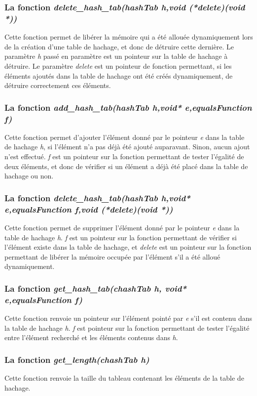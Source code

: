 \documentclass{report}
\begin{document}
\subsubsection*{La fonction \textit{delete\_hash\_tab(hashTab h,void (*delete)(void *))}}
Cette fonction permet de libérer la mémoire qui a été allouée dynamiquement lors de la création d'une table de hachage, et donc de détruire cette dernière. Le paramètre \textit{h} passé en paramètre est un pointeur sur la table de hachage à détruire. Le paramètre \textit{delete} est un pointeur de fonction permettant, si les éléments ajoutés dans la table de hachage ont été créés dynamiquement, de détruire correctement ces éléments.
\subsubsection*{La fonction \textit{add\_hash\_tab(hashTab h,void* e,equalsFunction f)}}
Cette fonction permet d'ajouter l'élément donné par le pointeur \textit{e} dans la table de hachage \textit{h}, si l'élément n'a pas déjà été ajouté auparavant. Sinon, aucun ajout n'est effectué. \textit{f} est un pointeur sur la fonction permettant de tester l'égalité de deux éléments, et donc de vérifier si un élément a déjà été placé dans la table de hachage ou non.
\subsubsection*{La fonction \textit{delete\_hash\_tab(hashTab h,void* e,equalsFunction f,void (*delete)(void *))}}
Cette fonction permet de supprimer l'élément donné par le pointeur \textit{e} dans la table de hachage \textit{h}. \textit{f} est un pointeur sur la fonction permettant de vérifier si l'élément existe dans la table de hachage, et \textit{delete} est un pointeur sur la fonction permettant de libérer la mémoire occupée par l'élément s'il a été alloué dynamiquement.
\subsubsection*{La fonction \textit{get\_hash\_tab(chashTab h, void* e,equalsFunction f)}}
Cette fonction renvoie un pointeur sur l'élément pointé par \textit{e} s'il est contenu dans la table de hachage \textit{h}. \textit{f} est pointeur sur la fonction permettant de tester l'égalité entre l'élément recherché et les éléments contenus dans \textit{h}.
\subsubsection*{La fonction \textit{get\_length(chashTab h)}}
Cette fonction renvoie la taille du tableau contenant les éléments de la table de hachage.
\end{document}
